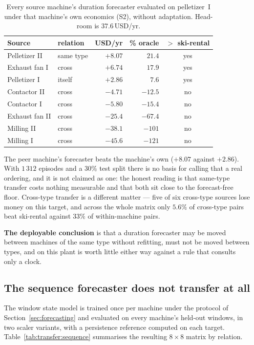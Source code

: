 \begin{table}[t]
\centering
\caption{Every source machine's duration forecaster evaluated on
pelletizer~I under that machine's own economics (S2), without
adaptation. Head-room is $37.6$\,USD/yr.}
\label{tab:transfer:currency}
\small
\begin{tabular}{@{}llrrc@{}}
\toprule
Source & relation & USD/yr & \% oracle & $>$ ski-rental \\
\midrule
Pelletizer II  & same type & $\mathbf{+8.07}$ & $21.4$ & yes \\
Exhaust fan I  & cross     & $+6.74$ & $17.9$ & yes \\
Pelletizer I   & itself    & $+2.86$ & $7.6$  & yes \\
Contactor II   & cross     & $-4.71$ & $-12.5$ & no \\
Contactor I    & cross     & $-5.80$ & $-15.4$ & no \\
Exhaust fan II & cross     & $-25.4$ & $-67.4$ & no \\
Milling II     & cross     & $-38.1$ & $-101$  & no \\
Milling I      & cross     & $-45.6$ & $-121$  & no \\
\bottomrule
\end{tabular}
\end{table}

The peer machine's forecaster beats the machine's own ($+8.07$ against
$+2.86$). With $1\,312$ episodes and a $30\%$ test split there is no
basis for calling that a real ordering, and it is not claimed as one:
the honest reading is that same-type transfer costs nothing measurable
and that both sit close to the forecast-free floor. Cross-type transfer
is a different matter --- five of six cross-type sources lose money on
this target, and across the whole matrix only $5.6\%$ of cross-type
pairs beat ski-rental against $33\%$ of within-machine pairs.

\textbf{The deployable conclusion} is that a duration forecaster may be
moved between machines of the same type without refitting, must not be
moved between types, and on this plant is worth little either way
against a rule that consults only a clock.

\subsection{The sequence forecaster does not transfer at all}
\label{sec:crossmachine:sequence}

The window state model is trained once per machine under the protocol of
Section~\ref{sec:forecasting} and evaluated on every machine's held-out
windows, in two scaler variants, with a persistence reference computed
on each target. Table~\ref{tab:transfer:sequence} summarises the
resulting $8\times8$ matrix by relation.

